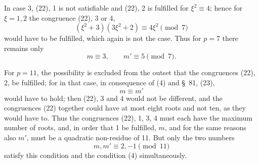 \documentclass[11pt]{article}
\begin{document}
In case 3, (22), 1 is not satisfiable and (22), 2 is fulfilled for $\xi^2\equiv4$; hence for $\xi=1,2$ the congruence (22), 3 or 4,
\[
 (\xi^2+3)(3\xi^2+2)\equiv4\xi^2\pmod7
\]
would have to be fulfilled, which again is not the case. Thus for $p=7$ there remains only
\begin{equation}
 m\equiv3,\qquad m'\equiv5\pmod7.
\tag{5}
\end{equation}

For $p=11$, the possibility is excluded from the outset that the congruences (22), 2, be fulfilled; for in that case, in consequence of (4) and \S~81, (23),
\[
 m\equiv m'
\]
would have to hold; then (22), 3 and 4 would not be different, and the congruences (22) together could have at most eight roots and not ten, as they would have to. Thus the congruences (22), 1, 3, 4 must each have the maximum number of roots, and, in order that 1 be fulfilled, $m$, and for the same reasons also $m'$, must be a quadratic non-residue of 11. But only the two numbers
\begin{equation}
 m,m'\equiv2,-1\pmod {11}
\tag{6}
\end{equation}
satisfy this condition and the condition (4) simultaneously.
\end{document}
